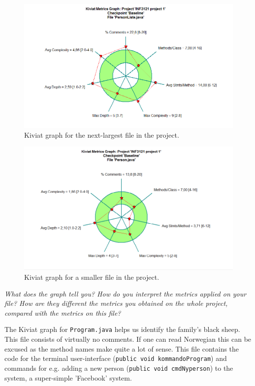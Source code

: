 \documentclass{article}
\begin{document}
\begin{figure}
\includegraphics[scale=0.5]{step3-2_kiviat_PersonListe}
\caption{
Kiviat graph for the next-largest file in the project.
}
\end{figure}

\begin{figure}
\includegraphics[scale=0.5]{step3-2_kiviat_Person}
\caption{
Kiviat graph for a smaller file in the project.
}
\end{figure}

\textit{What does the graph tell you? How do you interpret the metrics applied on your file? How are they different the metrics you obtained on the whole project, compared with the metrics on this file?}

The Kiviat graph for \texttt{Program.java} helps us identify the family's black sheep. This file consists of virtually no comments. If one can read 
Norwegian this can be excused as the method names make quite a lot of sense. This file contains the code for the terminal user-interface (\texttt{public 
void kommandoProgram}) and commands for e.g. adding a new person (\texttt{public void cmdNyperson}) to the system, a super-simple 'Facebook' system.
\end{document}
